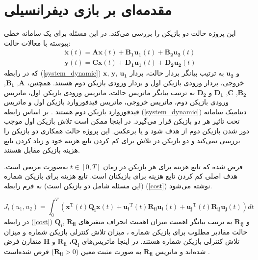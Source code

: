 \section{ مقدمه‌ای بر بازی دیفرانسیلی}\label{diffgameover}

 این پروژه حالت دو بازیکن را بررسی می‌کند. در این مسئله برای یک سامانه خطی پیوسته با معالات حالت:
 \begin{equation}\label{system_dynamic}
 	\begin{split}
 		 	&\boldsymbol{\dot x}(t) = \boldsymbol{Ax}(t) + \boldsymbol{B_1u_1}(t) + \boldsymbol{B_2u_2}(t)%
 		\\
 		&\boldsymbol{y}(t) = \boldsymbol{Cx}(t) + \boldsymbol{D_1u_1}(t) + \boldsymbol{D_2u_2}(t)
 	\end{split}
 \end{equation}
که در رابطه (\ref{system_dynamic})
$\boldsymbol x$, $\boldsymbol y$, $\boldsymbol{u_1}$
و
$\boldsymbol{u_2}$
به ترتیب بیانگر بردار حالت، بردار خروجی، بردار ورودی بازیکن اول و بردار ورودی بازیکن دوم هستند. همچنین، 
$\boldsymbol A$, $\boldsymbol{B_1}$, $\boldsymbol {B_2}$, $\boldsymbol C$, $\boldsymbol {D_1}$
و
$\boldsymbol{D_2}$
به ترتیب بیانگر ماتریس حالت، ماتریس ورودی بازیکن اول، ماتریس ورودی بازیکن دوم، ماتریس خروجی، ماتریس فیدفوروارد بازیکن اول و ماتریس فیدفوروارد بازیکن دوم هستند
\cite{mct}.
بر اساس رابطه (\ref{system_dynamic}) دینامیک سامانه تحت تاثیر هر دو بازیکن قرار می‌گیرد. در اینجا ممکن است تلاش  بازیکن اول موجب دور شدن بازیکن دوم از هدف شود و یا برعکس.  این پروژه حالت همکاری دو بازیکن را بررسی نمی‌کند و دو بازیکن در تلاش برای کم کردن تابع هزینه خود و زیاد کردن تابع هزینه بازیکن مقابل هستند.


  فرض شده  که تابع هزینه برای هر بازیکن در زمان $t \in [0, T]$ به‌صورت مربعی است.
  هدف اصلی کم کردن تابع هزینه برای بازیکنان است. تابع هزینه برای بازیکن شماره   (این مسئله شامل دو بازیکن است) به فرم رابطه (\ref{cost}) نوشته می‌شود.

 \begin{equation}\label{cost}
 	J_i(u_1, u_2) = \int_{0}^{T}\left( \boldsymbol{x} ^\mathrm{T}(t) \boldsymbol{Q_i} \boldsymbol{x}(t)+
 	 \boldsymbol{u_i} ^\mathrm{T}(t) \boldsymbol{R_{ii}} \boldsymbol{u_i}(t)+
 	 \boldsymbol{u_j} ^\mathrm{T}(t)\boldsymbol{ R_{ij} u_j}(t)
 	\right)dt
  \end{equation}
در رابطه
(\ref{cost})
$\boldsymbol{Q_i}$, $\boldsymbol{R_{ii}}$
و
$\boldsymbol{R_{ij}}$
به ترتیب بیانگر اهمیت میزان اهمیت انحراف متغیرهای حالت مقادیر مطلوب برای بازیکن شماره ، میزان تلاش کنترلی بازیکن شماره  و میزان تلاش کنترلی بازیکن شماره   هستند.
در اینجا ماتریس‌های 
$\boldsymbol{Q_i}$، $\boldsymbol{R_{ii}}$
و
$\boldsymbol{H}$
متقارن فرض شده‌اند و ماتریس 
$\boldsymbol{R_{ii}}$
به صورت مثبت معین ($\boldsymbol{R_{ii}}>0$)
فرض شده‌است \cite{article1}.

